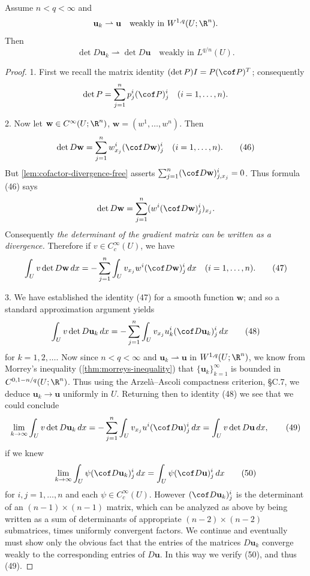 \begin{lemma}
\label{lem:weak-continuity-of-determinants}
Assume $n < q < \infty$ and
\[
\mathbf{u}_k \rightharpoonup \mathbf{u} \quad \text{weakly in } W^{1,q}(U; \R^n).
\]
Then
\[
\det D\mathbf{u}_k \rightharpoonup \det D\mathbf{u} \quad \text{weakly in } L^{q/n}(U).
\]
\end{lemma}
\begin{proof}
1. First we recall the matrix identity $(\det P)I = P(\cof P)^T$; consequently
\[
\det P = \sum_{j=1}^{n} p_j^i (\cof P)_j^i \quad (i = 1, \ldots, n).
\]

2. Now let $\mathbf{w} \in C^\infty(U; \R^n)$, $\mathbf{w} = (w^1, \ldots, w^n)$. Then
\[
\det D\mathbf{w} = \sum_{j=1}^{n} w_{x_j}^i (\cof D\mathbf{w})_j^i \quad (i = 1, \ldots, n).
\tag{46}
\]
But \cref{lem:cofactor-divergence-free} asserts $\sum_{j=1}^{n} (\cof D\mathbf{w})^i_{j,x_j} = 0$. Thus formula (46) says
\[
\det D\mathbf{w} = \sum_{j=1}^{n} (w^i(\cof D\mathbf{w})_j^i)_{x_j}.
\]
Consequently \textit{the determinant of the gradient matrix can be written as a divergence.} Therefore if $v \in C_c^\infty(U)$, we have
\[
\int_U v \det D\mathbf{w} \, dx = -\sum_{j=1}^{n} \int_U v_{x_j} w^i(\cof D\mathbf{w})_j^i \, dx \quad (i = 1, \ldots, n).
\tag{47}
\]

3. We have established the identity (47) for a smooth function $\mathbf{w}$; and so a standard approximation argument yields
\[
\int_U v \det D\mathbf{u}_k \, dx = -\sum_{j=1}^{n} \int_U v_{x_j} u_k^i(\cof D\mathbf{u}_k)_j^i \, dx
\tag{48}
\]
for $k = 1, 2, \ldots$. Now since $n < q < \infty$ and $\mathbf{u}_k \rightharpoonup \mathbf{u}$ in $W^{1,q}(U; \R^n)$, we know from Morrey's inequality (\cref{thm:morreys-inequality}) that $\{\mathbf{u}_k\}_{k=1}^\infty$ is bounded in $C^{0,1-n/q}(U; \R^n)$. Thus using the Arzel\`a--Ascoli compactness criterion, \S C.7, we deduce $\mathbf{u}_k \to \mathbf{u}$ uniformly in $U$. Returning then to identity (48) we see that we could conclude
\[
\lim_{k \to \infty} \int_U v \det D\mathbf{u}_k \, dx = -\sum_{j=1}^{n} \int_U v_{x_j} u^i(\cof D\mathbf{u})_j^i \, dx = \int_U v \det D\mathbf{u} \, dx,
\tag{49}
\]
if we knew
\[
\lim_{k \to \infty} \int_U \psi (\cof D\mathbf{u}_k)_j^i \, dx = \int_U \psi(\cof D\mathbf{u})_j^i \, dx
\tag{50}
\]
for $i, j = 1, \ldots, n$ and each $\psi \in C_c^\infty(U)$. However $(\cof D\mathbf{u}_k)_j^i$ is the determinant of an $(n-1) \times (n-1)$ matrix, which can be analyzed as above by being written as a sum of determinants of appropriate $(n-2) \times (n-2)$ submatrices, times uniformly convergent factors. We continue and eventually must show only the obvious fact that the entries of the matrices $D\mathbf{u}_k$ converge weakly to the corresponding entries of $D\mathbf{u}$. In this way we verify (50), and thus (49).


\end{proof}

